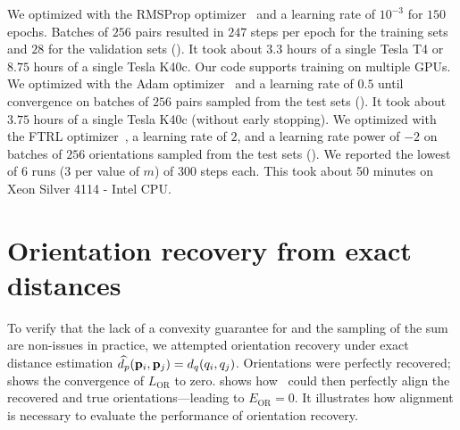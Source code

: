 We optimized  with the RMSProp optimizer~\cite{tieleman2012rmsprop} and a learning rate of $10^{-3}$ for $150$ epochs.
Batches of $256$ pairs resulted in $247$ steps per epoch for the training sets and $28$ for the validation sets ().
It took about $3.3$ hours of a single Tesla T4 or $8.75$ hours of a single Tesla K40c.
Our code supports training on multiple GPUs.
We optimized  with the Adam optimizer~\cite{kingma2014adam} and a learning rate of $0.5$ until convergence on batches of $256$ pairs sampled from the test sets ().
It took about $3.75$ hours of a single Tesla K40c (without early stopping).
We optimized  with the FTRL optimizer~\cite{mcmahan2013ftrl}, a learning rate of $2$, and a learning rate power of $-2$ on batches of $256$ orientations sampled from the test sets ().
We reported the lowest of 6 runs (3 per value of $m$) of 300 steps each.
This took about 50 minutes on Xeon Silver 4114 - Intel CPU\@.

\section{Orientation recovery from exact distances}\label{apx:results:orientation-recovery:exact}


To verify that the lack of a convexity guarantee for  and the sampling of the sum are non-issues in practice, we attempted orientation recovery under exact distance estimation $\widehat{d_p}(\mathbf{p}_i, \mathbf{p}_j) = d_q(q_i, q_j)$.
Orientations were perfectly recovered;
 shows the convergence of $L_\text{OR}$ to zero.
 shows how~ could then perfectly align the recovered and true orientations---leading to $E_\text{OR} = 0$.
It illustrates how alignment is necessary to evaluate the performance of orientation recovery.

